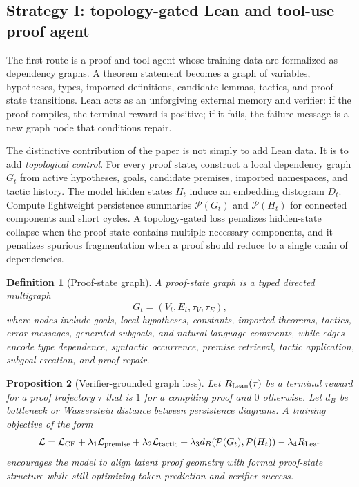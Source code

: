 \documentclass[11pt]{article}
\newtheorem{definition}{Definition}[section]
\newtheorem{proposition}[definition]{Proposition}
\newcommand{\1}{\mathbf{1}}
\begin{document}
\subsection{Strategy I: topology-gated Lean and tool-use proof agent}

The first route is a proof-and-tool agent whose training data are formalized as dependency graphs. A theorem statement becomes a graph of variables, hypotheses, types, imported definitions, candidate lemmas, tactics, and proof-state transitions. Lean acts as an unforgiving external memory and verifier: if the proof compiles, the terminal reward is positive; if it fails, the failure message is a new graph node that conditions repair.

The distinctive contribution of the paper is not simply to add Lean data. It is to add \emph{topological control}. For every proof state, construct a local dependency graph $G_t$ from active hypotheses, goals, candidate premises, imported namespaces, and tactic history. The model hidden states $H_t$ induce an embedding distogram $D_t$. Compute lightweight persistence summaries $\mathcal{P}(G_t)$ and $\mathcal{P}(H_t)$ for connected components and short cycles. A topology-gated loss penalizes hidden-state collapse when the proof state contains multiple necessary components, and it penalizes spurious fragmentation when a proof should reduce to a single chain of dependencies.

\begin{definition}[Proof-state graph]
A proof-state graph is a typed directed multigraph
\[
G_t=(V_t,E_t,\tau_V,\tau_E),
\]
where nodes include goals, local hypotheses, constants, imported theorems, tactics, error messages, generated subgoals, and natural-language comments, while edges encode type dependence, syntactic occurrence, premise retrieval, tactic application, subgoal creation, and proof repair.
\end{definition}

\begin{proposition}[Verifier-grounded graph loss]
Let $R_{\rm Lean}(\tau)$ be a terminal reward for a proof trajectory $\tau$ that is $1$ for a compiling proof and $0$ otherwise. Let $d_B$ be bottleneck or Wasserstein distance between persistence diagrams. A training objective of the form
\[
\mathcal{L}=\mathcal{L}_{\rm CE}+\lambda_1\mathcal{L}_{\rm premise}+\lambda_2\mathcal{L}_{\rm tactic}+\lambda_3 d_B(\mathcal{P}(G_t),\mathcal{P}(H_t))-\lambda_4 R_{\rm Lean}
\]
encourages the model to align latent proof geometry with formal proof-state structure while still optimizing token prediction and verifier success.
\end{proposition}
\end{document}
